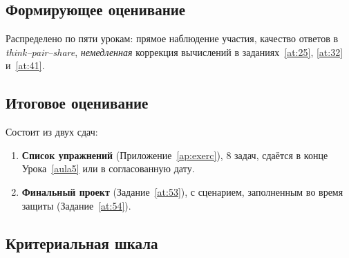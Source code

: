 \documentclass[12pt,a4paper]{scrartcl}
\begin{document}
\subsection{Формирующее оценивание}
Распределено по пяти урокам: прямое наблюдение участия, качество ответов в \emph{think--pair--share}, \emph{немедленная} коррекция вычислений в заданиях~\ref{at:25}, \ref{at:32} и~\ref{at:41}.

\subsection{Итоговое оценивание}
Состоит из двух сдач:

\begin{enumerate}[leftmargin=1.5em,itemsep=0.2em,topsep=0.3em,nosep]
  \item \textbf{Список упражнений} (Приложение~\ref{ap:exerc}), 8 задач, сдаётся в конце Урока~\ref{aula5} или в согласованную дату.
  \item \textbf{Финальный проект} (Задание~\ref{at:53}), с сценарием, заполненным во время защиты (Задание~\ref{at:54}).
\end{enumerate}

\subsection{Критериальная шкала}
\end{document}
